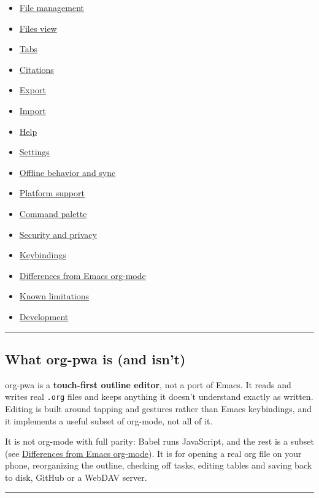\documentclass[11pt]{article}
\begin{document}
\begin{itemize}
\item \hyperref[sec:orgc48c2f3]{File management}
\item \hyperref[sec:org45e6d31]{Files view}
\item \hyperref[sec:orgb1922d6]{Tabs}
\item \hyperref[sec:org1a3b79e]{Citations}
\item \hyperref[sec:org9a53e51]{Export}
\item \hyperref[sec:org7f0c526]{Import}
\item \hyperref[sec:org65b75d7]{Help}
\item \hyperref[sec:org788d206]{Settings}
\item \hyperref[sec:org1ff17da]{Offline behavior and sync}
\item \hyperref[sec:orgc1b1d56]{Platform support}
\item \hyperref[sec:org55cb874]{Command palette}
\item \hyperref[sec:orgdd05865]{Security and privacy}
\item \hyperref[sec:orga8a12f7]{Keybindings}
\item \hyperref[sec:org634683a]{Differences from Emacs org-mode}
\item \hyperref[sec:orgff06c0a]{Known limitations}
\item \hyperref[sec:orga70b746]{Development}
\end{itemize}

\noindent\rule{\textwidth}{0.5pt}

\subsection{What org-pwa is (and isn't)}
\label{sec:orge9fbe41}
org-pwa is a \textbf{touch-first outline editor}, not a port of Emacs. It reads and writes real \texttt{.org} files and keeps anything it doesn't understand exactly as written. Editing is built around tapping and gestures rather than Emacs keybindings, and it implements a useful subset of org-mode, not all of it.

It is not org-mode with full parity: Babel runs JavaScript, and the rest is a subset (see \hyperref[sec:org634683a]{Differences from Emacs org-mode}). It is for opening a real org file on your phone, reorganizing the outline, checking off tasks, editing tables and saving back to disk, GitHub or a WebDAV server.

\noindent\rule{\textwidth}{0.5pt}
\end{document}
